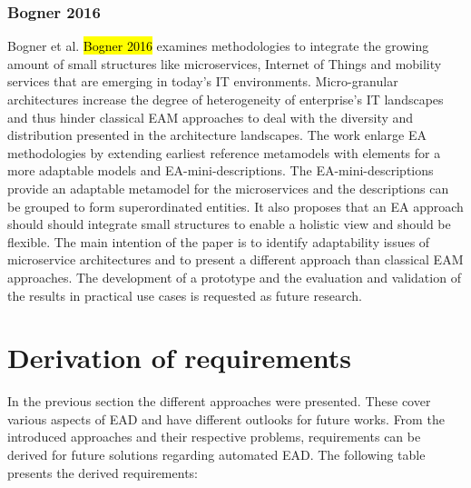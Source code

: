 \subsubsection{Bogner 2016}
Bogner et al. \hl{Bogner 2016} examines methodologies to integrate the growing amount of small structures like microservices, Internet of Things and mobility services that are emerging in today's IT environments. Micro-granular architectures increase the degree of heterogeneity of enterprise's IT landscapes and thus hinder classical EAM approaches to deal with the diversity and distribution presented in the architecture landscapes. The work enlarge EA methodologies by extending earliest reference metamodels with elements for a more adaptable models and EA-mini-descriptions. The EA-mini-descriptions provide an adaptable metamodel for the microservices and the descriptions can be grouped to form superordinated entities. It also proposes that an EA approach should should integrate small structures to enable a holistic view and should be flexible. The main intention of the paper is to identify adaptability issues of microservice architectures and to present a different approach than classical EAM approaches. The development of a prototype and the evaluation and validation of the results in practical use cases is requested as future research.

\section{Derivation of requirements}\label{subsection:derivationofrequirements}

In the previous section the different approaches were presented. These cover various aspects of EAD and have different outlooks for future works. From the introduced approaches and their respective problems, requirements can be derived for future solutions regarding automated EAD. The following table presents the derived requirements:

